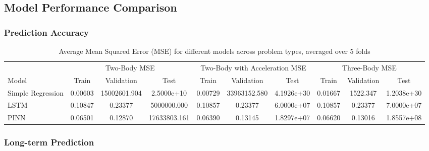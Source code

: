 \documentclass[12pt,a4paper]{article}
\begin{document}
\subsection{Model Performance Comparison}

\subsubsection{Prediction Accuracy}
\begin{table}[h]
    \centering
    \begin{tabular}{lccccccccc}
        \hline
        & \multicolumn{3}{c}{Two-Body MSE} & \multicolumn{3}{c}{Two-Body with Acceleration MSE} & \multicolumn{3}{c}{Three-Body MSE} \\
        Model & Train & Validation & Test & Train & Validation & Test & Train & Validation & Test \\
        \hline
        Simple Regression & 0.00603 & 15002601.904 & 2.5000e+10 & 0.00729 & 33963152.580 & 4.1926e+30 & 0.01667 & 1522.347 & 1.2038e+30 \\
        LSTM & 0.10847 & 0.23377 & 5000000.000 & 0.10857 & 0.23377 & 6.0000e+07 & 0.10857 & 0.23377 & 7.0000e+07 \\
        PINN & 0.06501 & 0.12870 & 17633803.161 & 0.06390 & 0.13145 & 1.8297e+07 & 0.06620 & 0.13016 & 1.8557e+08 \\
        \hline
    \end{tabular}
    \caption{Average Mean Squared Error (MSE) for different models across problem types, averaged over 5 folds}
    \label{tab:model_mse}
\end{table}


\subsubsection{Long-term Prediction}
\end{document}
